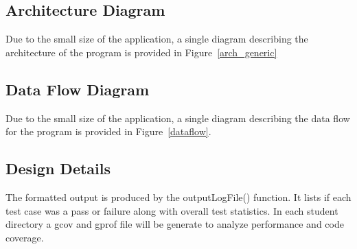 \subsection{ Architecture  Diagram}
Due to the small size of the application, a single diagram describing the architecture of the program is provided in Figure~\ref{arch_generic}


\subsection{Data Flow Diagram}
Due to the small size of the application, a single diagram describing the data flow for the program is provided in Figure~\ref{dataflow}.

\subsection{Design Details}
The formatted output is produced by the outputLogFile() function. It lists if each test case was a pass or failure along with overall test statistics. In each student directory a gcov and gprof file will be generate to analyze performance and code coverage. 


